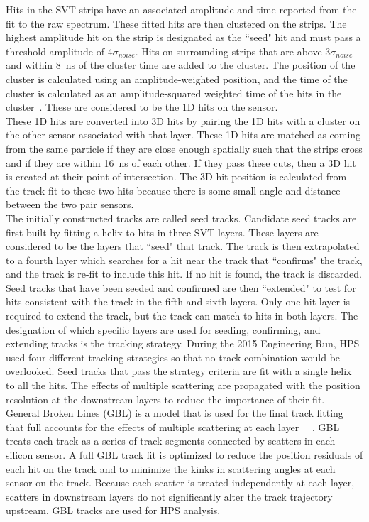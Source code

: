Hits in the SVT strips have an associated amplitude and time reported from the fit to the raw spectrum. These fitted hits are then clustered on the strips. The highest amplitude hit on the strip is designated as the ``seed" hit and must pass a threshold amplitude of $4\sigma_{noise}$. Hits on surrounding strips that are above $3\sigma_{noise}$ and within 8~ns of the cluster time are added to the cluster. The position of the cluster is calculated using an amplitude-weighted position, and the time of the cluster is calculated as an amplitude-squared weighted time of the hits in the cluster~\cite{uemura_search_2016}. These are considered to be the 1D hits on the sensor. \\
\indent These 1D hits are converted into 3D hits by pairing the 1D hits with a cluster on the other sensor associated with that layer. These 1D hits are matched as coming from the same particle if they are close enough spatially such that the strips cross and if they are within 16~ns of each other. If they pass these cuts, then a 3D hit is created at their point of intersection. The 3D hit position is calculated from the track fit to these two hits because there is some small angle and distance between the two pair sensors.\\
\indent The initially constructed tracks are called seed tracks. Candidate seed tracks are first built by fitting a helix to hits in three SVT layers. These layers are considered to be the layers that ``seed" that track. The track is then extrapolated to a fourth layer which searches for a hit near the track that ``confirms" the track, and the track is re-fit to include this hit. If no hit is found, the track is discarded. Seed tracks that have been seeded and confirmed are then ``extended" to test for hits consistent with the track in the fifth and sixth layers. Only one hit layer is required to extend the track, but the track can match to hits in both layers. The designation of which specific layers are used for seeding, confirming, and extending tracks is the tracking strategy. During the 2015 Engineering Run, HPS used four different tracking strategies so that no track combination would be overlooked. Seed tracks that pass the strategy criteria are fit with a single helix to all the hits. The effects of multiple scattering are propagated with the position resolution at the downstream layers to reduce the importance of their fit.\\
\indent General Broken Lines (GBL) is a model that is used for the final track fitting that full accounts for the effects of multiple scattering at each layer~\cite{blobel_fast_2011}~\cite{kleinwort_general_2012} . GBL treats each track as a series of track segments connected by scatters in each silicon sensor. A full GBL track fit is optimized to reduce the position residuals of each hit on the track and to minimize the kinks in scattering angles at each sensor on the track. Because each scatter is treated independently at each layer, scatters in downstream layers do not significantly alter the track trajectory upstream. GBL tracks are used for HPS analysis. 

